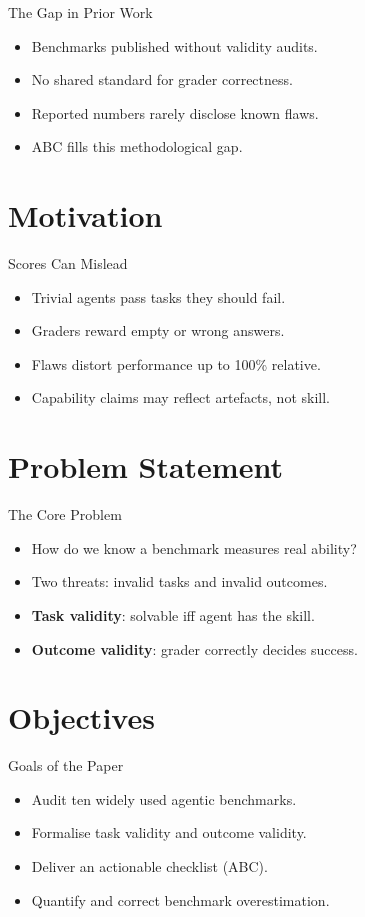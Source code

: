 \documentclass{beamer}
\begin{document}
\begin{frame}{The Gap in Prior Work}
\begin{itemize}
\item Benchmarks published without validity audits.
\item No shared standard for grader correctness.
\item Reported numbers rarely disclose known flaws.
\item ABC fills this methodological gap.
\end{itemize}
\end{frame}

\section{Motivation}
\begin{frame}{Scores Can Mislead}
\begin{itemize}
\item Trivial agents pass tasks they should fail.
\item Graders reward empty or wrong answers.
\item Flaws distort performance up to 100\% relative.
\item Capability claims may reflect artefacts, not skill.
\end{itemize}
\end{frame}

\section{Problem Statement}
\begin{frame}{The Core Problem}
\begin{itemize}
\item How do we know a benchmark measures real ability?
\item Two threats: invalid tasks and invalid outcomes.
\item \textbf{Task validity}: solvable iff agent has the skill.
\item \textbf{Outcome validity}: grader correctly decides success.
\end{itemize}
\end{frame}

\section{Objectives}
\begin{frame}{Goals of the Paper}
\begin{itemize}
\item Audit ten widely used agentic benchmarks.
\item Formalise task validity and outcome validity.
\item Deliver an actionable checklist (ABC).
\item Quantify and correct benchmark overestimation.
\end{itemize}
\end{frame}
\end{document}
